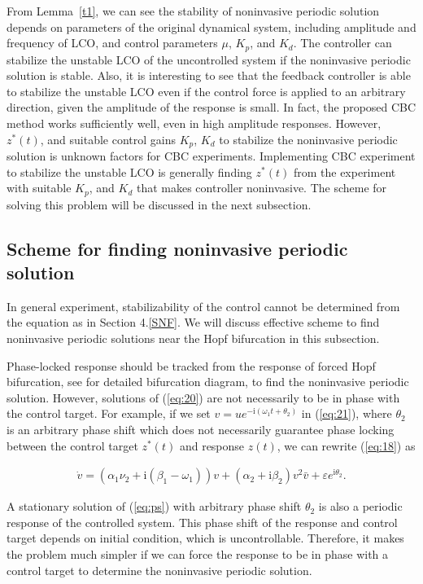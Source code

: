\documentclass[openacc]{rsproca_new}%
\def\epsilon{\varepsilon}
\newcommand{\Eref}[1]{(\ref{#1})}
\newcommand{\Lref}[1]{Lemma~\ref{#1}}
\begin{document}
\noindent From \Lref{t1}, we can see the stability of noninvasive periodic solution depends on parameters of the original dynamical system, including amplitude and frequency of LCO, and control parameters $\mu$, $K_p$, and $K_d$. The controller can stabilize the unstable LCO of the uncontrolled system if the noninvasive periodic solution is stable. Also, it is interesting to see that the feedback controller is able to stabilize the unstable LCO even if the control force is applied to an arbitrary direction, given the amplitude of the response is small. In fact, the proposed CBC method works sufficiently well, even in high amplitude responses. However, $z^*(t)$, and suitable control gains $K_p$, $K_d$ to stabilize the noninvasive periodic solution is unknown factors for CBC experiments. Implementing CBC experiment to stabilize the unstable LCO is generally finding $z^*(t)$ from the experiment with suitable $K_p$, and $K_d$ that makes controller noninvasive. The scheme for solving this problem will be discussed in the next subsection.

\subsection{Scheme for finding noninvasive periodic solution}\label{FNP}

In general experiment, stabilizability of the control cannot be determined from the equation as in Section 4.\ref{SNF}. We will discuss effective scheme to find noninvasive periodic solutions near the Hopf bifurcation in this subsection.

Phase-locked response should be tracked from the response of forced Hopf bifurcation, see \cite{zhang2011periodically,wiser2015bifurcations} for detailed bifurcation diagram, to find the noninvasive periodic solution. However, solutions of \Eref{eq:20} are not necessarily to be in phase with the control target. For example, if we set  $v=ue^{-\textrm{i}(\omega_1 t+\theta_2)}$ in \Eref{eq:21}, where $\theta_2$ is an arbitrary phase shift which does not necessarily guarantee phase locking between the control target $z^*(t)$ and response $z(t)$, we can rewrite \Eref{eq:18} as

\begin{align}\label{eq:ps}
  \dot v=(\alpha_1 \nu_2+\textrm{i}(\beta_1-\omega_1))v+(\alpha_2+\textrm{i}\beta_2)v^2\bar{v}+\epsilon e^{\textrm{i} \theta_2}.
\end{align}

\noindent A stationary solution of \Eref{eq:ps} with arbitrary phase shift $\theta_2$ is also a periodic response of the controlled system. This phase shift of the response and control target depends on initial condition, which is uncontrollable. Therefore, it makes the problem much simpler if we can force the response to be in phase with a control target to determine the noninvasive periodic solution.
\end{document}
